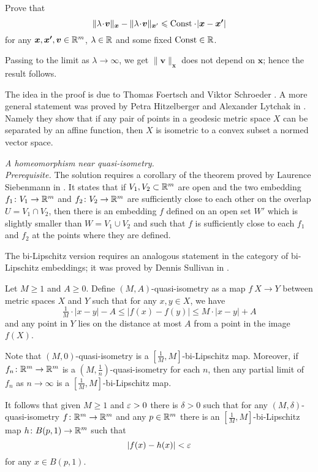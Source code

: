 Prove that 
\[
\|\lambda\cdot\bm{v}\|_{\bm{x}}
-
\|\lambda\cdot\bm{v}\|_{\bm{x}'}
\le 
\Const\cdot |\bm{x}-\bm{x'}|\]
for any $\bm{x},\bm{x'},\bm{v}\in\mathbb{R}^m$, 
$\lambda\in\mathbb{R}$
and some fixed $\operatorname{\rm Const}\in\mathbb{R}$.

Passing to the limit as $\lambda\to\infty$, 
we get
$\|\bm{v}\|_{\bm{x}}$ does not depend on $\bm{x}$;
hence the result follows.

The idea in the proof is due to Thomas Foertsch
and Viktor Schroeder \cite[see][]{foertsch-schroeder}.
A more general statement was proved by Petra Hitzelberger and Alexander Lytchak in \cite{hitzelberger-lytchak}.
Namely they show that 
if any pair of points in a geodesic metric space $X$ can be separated by an affine function,
then $X$ is isometric to a convex subset a normed vector space.


\textit{A homeomorphism near quasi-isometry.}\\
\textit{Prerequisite.}
The solution requires a corollary of the theorem  proved by Laurence Siebenmann in \cite{siebenmann}.
It states that 
if $V_1, V_2\subset\mathbb{R}^m$ are open
and the two embedding $f_1\colon V_1\to\mathbb{R}^m$ and $f_2\colon V_2\to\mathbb{R}^m$ 
are sufficiently close to each other 
on the overlap $U=V_1\cap V_2$, 
then
there is an embedding $f$ defined on an open set $W'$
which is slightly smaller than $W=V_1\cup V_2$
and such that $f$ is sufficiently close to each $f_1$ and $f_2$ at the points where they are defined.

The  bi-Lipschitz version requires 
an analogous statement in the category of bi-Lipschitz embeddings;
it was proved by
Dennis Sullivan in \cite{sullivan}.

Let $M\ge 1$ and $A\ge 0$.
Define $(M,A)$-quasi-isometry
as a map $f\:X\to Y$ between metric spaces $X$ and $Y$ such that for any $x,y\in X$,
 we have
\[\tfrac1M\cdot |x-y|-A\le |f(x)-f(y)|\le M\cdot |x-y|+A\]
and any point in $Y$ lies on the distance at most $A$ from a point in the image $f(X)$.

{\sloppy
Note that $(M,0)$-quasi-isometry is a $[\tfrac1M,M]$-bi-Lipschitz map.
Moreover,
if $f_n\colon\mathbb{R}^m\to\mathbb{R}^m$ is a  $(M,\frac1n)$-quasi-isometry 
for each $n$, 
then any partial limit of $f_n$ as $n\to\infty$
is a $[\tfrac1M,M]$-bi-Lipschitz map.

}

It follows that given $M\ge 1$ and $\varepsilon>0$ there is $\delta>0$ such that 
for any $(M,\delta)$-quasi-isometry $f\colon\mathbb{R}^m\to\mathbb{R}^m$ and any $p\in \mathbb{R}^m$
there is an $[\tfrac1M,M]$-bi-Lipschitz map $h\colon B(p,1)\to \mathbb{R}^m$
such that
\[|f(x)-h(x)|<\varepsilon\]
for any $x\in B(p,1)$.

